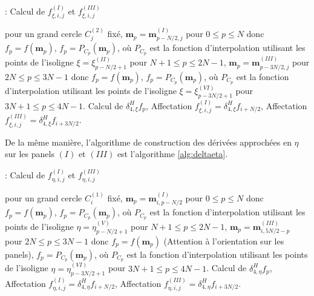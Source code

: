 \begin{center}
\begin{minipage}[H]{12cm}
  \begin{algorithm}[H]
    \caption{: Calcul de $f_{\xi, i, j}^{(I)}$ et $f_{\xi, i, j}^{(III)}$}\label{alg:deltaxi}
    \begin{algorithmic}[1]
    \State pour un grand cercle $C_j^{(2)}$ fixé,
             \State  $\mathbf{m}_p = \mathbf{m}_{p-N/2,j}^{(I)}$ pour $0  \leq p \leq N$ donc $f_p = f(\mathbf{m}_p)$,
             \State $f_p = P_{C_p}(\mathbf{m}_p)$, où $P_{C_p}$ est la fonction d'interpolation utilisant les points de l'isoligne $\xi = \xi^{(II)}_{p-N/2+1}$ pour $N+1 \leq p \leq 2N-1$,
             \State  $\mathbf{m}_p = \mathbf{m}_{p-3N/2,j}^{(III)}$ pour $2N  \leq p \leq 3N-1$ donc $f_p = f(\mathbf{m}_p)$,
             \State $f_p = P_{C_p}(\mathbf{m}_p)$, où $P_{C_p}$ est la fonction d'interpolation utilisant les points de l'isoligne $\xi = \xi^{(VI)}_{p-3N/2+1}$ pour $3N+1 \leq p \leq 4N-1$.
            \EndFor
    \State Calcul de $\delta_{4, \xi}^H f_p$,
    \State Affectation $f_{\xi,i,j}^{(I)} = \delta_{4, \xi}^H f_{i+N/2}$,
    \State Affectation $f_{\xi,i,j}^{(III)} = \delta_{4, \xi}^H f_{i+3N/2}$.
    \EndFor
    \end{algorithmic}
    \end{algorithm}
\end{minipage}
\end{center}
De la même manière, l'algorithme de construction des dérivées approchées en $\eta$ sur les panels $(I)$ et $(III)$ est l'algorithme \ref{alg:deltaeta}.
\begin{center}
\begin{minipage}[H]{12cm}
  \begin{algorithm}[H]
    \caption{: Calcul de $f_{\eta, i, j}^{(I)}$ et $f_{\eta, i, j}^{(III)}$}\label{alg:deltaeta}
    \begin{algorithmic}[1]
    \State pour un grand cercle $C_i^{(1)}$ fixé,
             \State  $\mathbf{m}_p = \mathbf{m}_{i,p-N/2}^{(I)}$ pour $0  \leq p \leq N$ donc $f_p = f(\mathbf{m}_p)$,
             \State $f_p = P_{C_p}(\mathbf{m}_p)$, où $P_{C_p}$ est la fonction d'interpolation utilisant les points de l'isoligne $\eta = \eta^{(V)}_{p-N/2+1}$ pour $N+1 \leq p \leq 2N-1$,
             \State  $\mathbf{m}_p = \mathbf{m}_{i,5N/2-p}^{(III)}$ pour $2N  \leq p \leq 3N-1$ donc $f_p = f(\mathbf{m}_p)$ (Attention à l'orientation sur les panels),
             \State $f_p = P_{C_p}(\mathbf{m}_p)$, où $P_{C_p}$ est la fonction d'interpolation utilisant les points de l'isoligne $\eta = \eta^{(VI)}_{p-3N/2+1}$ pour $3N+1 \leq p \leq 4N-1$.
            \EndFor
    \State Calcul de $\delta_{4, \eta}^H f_p$,
    \State Affectation $f_{\eta,i,j}^{(I)} = \delta_{4, \eta}^H f_{i+N/2}$,
    \State Affectation $f_{\eta,i,j}^{(III)} = \delta_{4, \eta}^H f_{i+3N/2}$.
    \EndFor
    \end{algorithmic}
    \end{algorithm}
\end{minipage}
\end{center}
